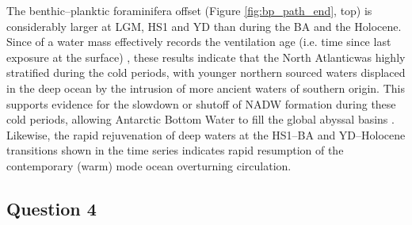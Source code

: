 The benthic--planktic foraminifera \fC{} offset (Figure \ref{fig:bp_path_end}, top) is considerably larger at LGM, HS1 and YD than during the BA and the Holocene.
Since \fC{} of a water mass effectively records the ventilation age (i.e. time since last exposure at the surface) \parencite{lynch2014tracers}, these results indicate that the North Atlanticwas highly stratified during the cold periods, with younger northern sourced waters displaced in the deep ocean by the intrusion of more ancient waters of southern origin.
This supports evidence for the slowdown or shutoff of NADW formation during these cold periods, allowing Antarctic Bottom Water to fill the global abyssal basins \parencite{boyle1985comparison, bard1994north, thornalley2011deglacial}.
Likewise, the rapid rejuvenation of deep waters at the HS1--BA and YD--Holocene transitions shown in the \fC{} time series indicates rapid resumption of the contemporary (warm) mode ocean overturning circulation.

\subsection{Question 4}
\label{sec:Q2.4}

